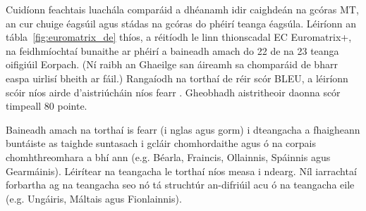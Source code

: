 \begin{multicols}{2}
Cuidíonn feachtais luachála comparáid a dhéanamh idir caighdeán na gcóras MT, an cur chuige éagsúil agus stádas na gcóras do phéirí teanga éagsúla. Léiríonn an tábla~\ref{fig:euromatrix_de} thíos, a réitíodh le linn thionscadal EC Euromatrix+, na feidhmíochtaí bunaithe ar phéirí a baineadh amach do 22 de na 23 teanga oifigiúil Eorpach. (Ní raibh an Ghaeilge san áireamh sa chomparáid de bharr easpa uirlisí bheith ar fáil.) Rangaíodh na torthaí de réir scór BLEU, a léiríonn scóir níos airde d’aistriúcháin níos fearr \cite{bleu1}. Gheobhadh aistritheoir daonna scór timpeall 80 pointe.

Baineadh amach na torthaí is fearr (i nglas agus gorm) i dteangacha a fhaigheann buntáiste as taighde suntasach i gcláir chomhordaithe agus ó na corpais chomhthreomhara a bhí ann (e.g. Béarla, Fraincis, Ollainnis, Spáinnis agus Gearmáinis). Léirítear na teangacha le torthaí níos measa i ndearg. Níl iarrachtaí forbartha ag na teangacha seo nó tá struchtúr an-difriúil acu ó na teangacha eile (e.g. Ungáiris, Máltais agus Fionlainnis).


\end{multicols}
